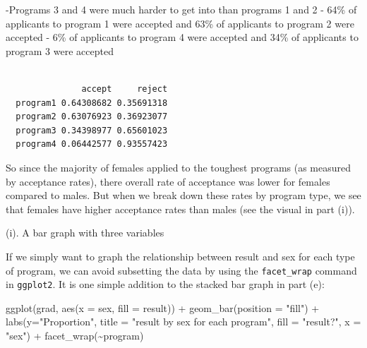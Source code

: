 \documentclass[
]{book}
\newenvironment{Shaded}{\begin{snugshade}}{\end{snugshade}}
\newcommand{\AttributeTok}[1]{\textcolor[rgb]{0.77,0.63,0.00}{#1}}
\newcommand{\DecValTok}[1]{\textcolor[rgb]{0.00,0.00,0.81}{#1}}
\newcommand{\FunctionTok}[1]{\textcolor[rgb]{0.00,0.00,0.00}{#1}}
\newcommand{\NormalTok}[1]{#1}
\newcommand{\SpecialCharTok}[1]{\textcolor[rgb]{0.00,0.00,0.00}{#1}}
\newcommand{\StringTok}[1]{\textcolor[rgb]{0.31,0.60,0.02}{#1}}
\begin{document}
-Programs 3 and 4 were much harder to get into than programs 1 and 2
- 64\% of applicants to program 1 were accepted and 63\% of applicants to program 2 were accepted
- 6\% of applicants to program 4 were accepted and 34\% of applicants to program 3 were accepted

\begin{Shaded}
\end{Shaded}

\begin{verbatim}
          
               accept     reject
  program1 0.64308682 0.35691318
  program2 0.63076923 0.36923077
  program3 0.34398977 0.65601023
  program4 0.06442577 0.93557423
\end{verbatim}

So since the majority of females applied to the toughest programs (as measured by acceptance rates),
there overall rate of acceptance was lower for females compared to males. But when we break down
these rates by program type, we see that females have higher acceptance rates than males (see the
visual in part (i)).

(i). A bar graph with three variables

If we simply want to graph the relationship between result and sex for each type of program, we can avoid subsetting the data by using the \texttt{facet\_wrap} command in \texttt{ggplot2}. It is one simple addition to the stacked bar graph in part (e):

\begin{Shaded}
\begin{Highlighting}[]
\FunctionTok{ggplot}\NormalTok{(grad, }\FunctionTok{aes}\NormalTok{(}\AttributeTok{x =}\NormalTok{ sex, }\AttributeTok{fill =}\NormalTok{ result)) }\SpecialCharTok{+} 
  \FunctionTok{geom\_bar}\NormalTok{(}\AttributeTok{position =} \StringTok{"fill"}\NormalTok{) }\SpecialCharTok{+} 
  \FunctionTok{labs}\NormalTok{(}\AttributeTok{y=}\StringTok{"Proportion"}\NormalTok{, }
       \AttributeTok{title =} \StringTok{"result by sex for each program"}\NormalTok{, }
       \AttributeTok{fill =} \StringTok{"result?"}\NormalTok{, }
       \AttributeTok{x =} \StringTok{"sex"}\NormalTok{) }\SpecialCharTok{+} 
  \FunctionTok{facet\_wrap}\NormalTok{(}\SpecialCharTok{\textasciitilde{}}\NormalTok{program)}
\end{Highlighting}
\end{Shaded}
\end{document}
